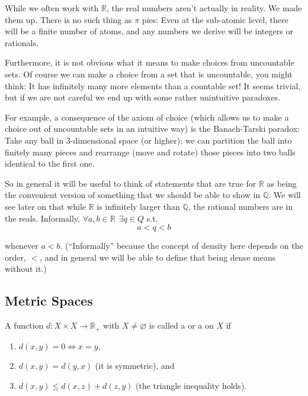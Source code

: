 \documentclass{article}
\begin{document}
\begin{tacomment}{1}
  While we often work with $\mathbb{R}$, the real numbers aren't actually in reality. We made them up. There is no such thing as $\pi$ pies: Even at the sub-atomic level, there will be a finite number of atoms, and any numbers we derive will be integers or rationals.

  Furthermore, it is not obvious what it means to make choices from uncountable sets.  Of course we can make a choice from a set that is uncountable, you might think: It has infinitely many more elements than a countable set! It seems trivial, but if we are not careful we end up with some rather unintuitive paradoxes.

  For example, a consequence of the axiom of choice (which allows us to make a choice out of uncountable sets in an intuitive way) is the Banach-Tarski paradox: Take any ball in 3-dimensional space (or higher); we can partition the ball into finitely many pieces and rearrange (move and rotate) those pieces into two balls identical to the first one.

  So in general it will be useful to think of statements that are true for $\mathbb{R}$ as being the convenient version of something that we should be able to show in $\mathbb{Q}$. We will see later on that while $\mathbb{R}$ is infinitely larger than $\mathbb{Q}$, the rational numbers are  in the reals. Informally, $\forall a, b \in \mathbb{R} ~~ \exists q \in Q$ s.t.
  \[
    a < q < b
  \]

  whenever $a < b$. (``Informally'' because the concept of density here depends on the order, $<$, and in general we will be able to define that being dense means without it.)
\end{tacomment}

\subsection{Metric Spaces}
\label{sub:metric_spaces}

\begin{definition}[distance]\label{def:lecture1_distance}
  A function $d: X \times X \to \mathbb{R}_+$ with $X \ne \varnothing$ is called a  or a  on $X$ if
  \begin{enumerate}
    \item $d(x, y) = 0 \iff x = y$,

    \item $d(x, y) = d(y, x)$ (it is symmetric), and

    \item $d(x, y) \le d(x, z) + d(z, y)$ (the triangle inequality holds).
  \end{enumerate}
\end{definition}
\end{document}
